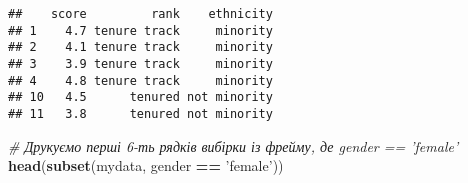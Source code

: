 \documentclass[
]{article}
\newenvironment{Shaded}{\begin{snugshade}}{\end{snugshade}}
\newcommand{\CommentTok}[1]{\textcolor[rgb]{0.56,0.35,0.01}{\textit{#1}}}
\newcommand{\DecValTok}[1]{\textcolor[rgb]{0.00,0.00,0.81}{#1}}
\newcommand{\KeywordTok}[1]{\textcolor[rgb]{0.13,0.29,0.53}{\textbf{#1}}}
\newcommand{\NormalTok}[1]{#1}
\newcommand{\OperatorTok}[1]{\textcolor[rgb]{0.81,0.36,0.00}{\textbf{#1}}}
\newcommand{\StringTok}[1]{\textcolor[rgb]{0.31,0.60,0.02}{#1}}
\begin{document}
\begin{Shaded}
\end{Shaded}

\begin{verbatim}
##    score         rank    ethnicity
## 1    4.7 tenure track     minority
## 2    4.1 tenure track     minority
## 3    3.9 tenure track     minority
## 4    4.8 tenure track     minority
## 10   4.5      tenured not minority
## 11   3.8      tenured not minority
\end{verbatim}

\begin{Shaded}
\begin{Highlighting}[]
\CommentTok{# Друкуємо перші 6-ть рядків вибірки із фрейму, де gender == 'female'}
\KeywordTok{head}\NormalTok{(}\KeywordTok{subset}\NormalTok{(mydata, gender }\OperatorTok{==}\StringTok{ 'female'}\NormalTok{))}
\end{Highlighting}
\end{Shaded}
\end{document}
